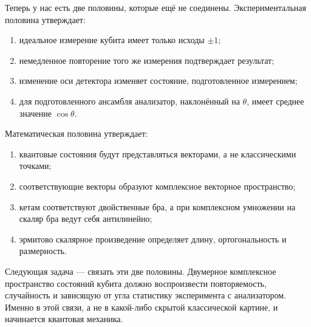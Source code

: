Теперь у нас есть две половины, которые ещё не соединены. Экспериментальная половина утверждает:
\begin{enumerate}
  \item идеальное измерение кубита имеет только исходы \(\pm1\);
  \item немедленное повторение того же измерения подтверждает результат;
  \item изменение оси детектора изменяет состояние, подготовленное измерением;
  \item для подготовленного ансамбля анализатор, наклонённый на \(\theta\), имеет среднее значение \(\cos\theta\).
\end{enumerate}
Математическая половина утверждает:
\begin{enumerate}
  \item квантовые состояния будут представляться векторами, а не классическими точками;
  \item соответствующие векторы образуют комплексное векторное пространство;
  \item кетам соответствуют двойственные бра, а при комплексном умножении на скаляр бра ведут себя антилинейно;
  \item эрмитово скалярное произведение определяет длину, ортогональность и размерность.
\end{enumerate}

Следующая задача — связать эти две половины. Двумерное комплексное пространство состояний кубита должно воспроизвести повторяемость, случайность и зависящую от угла статистику эксперимента с анализатором. Именно в этой связи, а не в какой-либо скрытой классической картине, и начинается квантовая механика.
